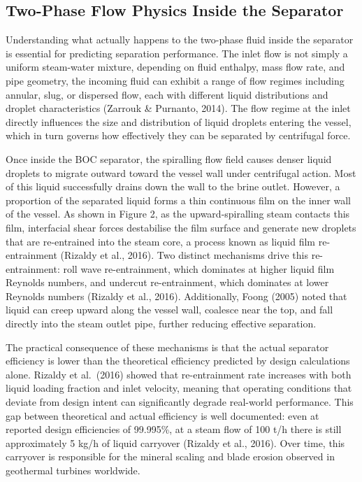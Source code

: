 \subsection{Two-Phase Flow Physics Inside the Separator}

Understanding what actually happens to the two-phase fluid inside the separator is essential for predicting separation performance. The inlet flow is not simply a uniform steam-water mixture, depending on fluid enthalpy, mass flow rate, and pipe geometry, the incoming fluid can exhibit a range of flow regimes including annular, slug, or dispersed flow, each with different liquid distributions and droplet characteristics (Zarrouk \& Purnanto, 2014). The flow regime at the inlet directly influences the size and distribution of liquid droplets entering the vessel, which in turn governs how effectively they can be separated by centrifugal force.

Once inside the BOC separator, the spiralling flow field causes denser liquid droplets to migrate outward toward the vessel wall under centrifugal action. Most of this liquid successfully drains down the wall to the brine outlet. However, a proportion of the separated liquid forms a thin continuous film on the inner wall of the vessel. As shown in Figure 2, as the upward-spiralling steam contacts this film, interfacial shear forces destabilise the film surface and generate new droplets that are re-entrained into the steam core, a process known as liquid film re-entrainment (Rizaldy et al., 2016). Two distinct mechanisms drive this re-entrainment: roll wave re-entrainment, which dominates at higher liquid film Reynolds numbers, and undercut re-entrainment, which dominates at lower Reynolds numbers (Rizaldy et al., 2016). Additionally, Foong (2005) noted that liquid can creep upward along the vessel wall, coalesce near the top, and fall directly into the steam outlet pipe, further reducing effective separation.

The practical consequence of these mechanisms is that the actual separator efficiency is lower than the theoretical efficiency predicted by design calculations alone. Rizaldy et al.~(2016) showed that re-entrainment rate increases with both liquid loading fraction and inlet velocity, meaning that operating conditions that deviate from design intent can significantly degrade real-world performance. This gap between theoretical and actual efficiency is well documented: even at reported design efficiencies of 99.995\%, at a steam flow of 100 t/h there is still approximately 5 kg/h of liquid carryover (Rizaldy et al., 2016). Over time, this carryover is responsible for the mineral scaling and blade erosion observed in geothermal turbines worldwide.

